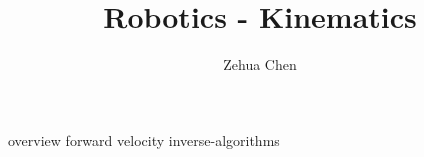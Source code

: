\documentclass{../../../shared/latex/notes}
\title{Robotics - Kinematics}
\author{Zehua Chen}
\begin{document}
  \maketitle
  \tableofcontents

  {overview}
  {forward}
  {velocity}
  {inverse-algorithms}

  \newpage
  \printglossaries
\end{document}
